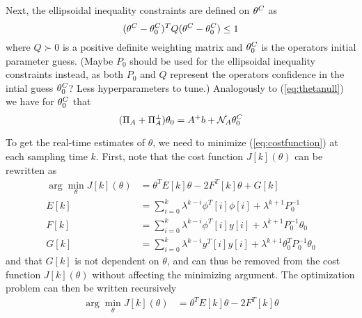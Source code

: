 Next, the ellipsoidal inequality constraints are defined on $\theta^C$ as
\begin{equation}
    (\theta^C - \theta^C_0)^TQ(\theta^C - \theta^C_0) \leq 1
\end{equation}
where $Q \succ 0$ is a positive definite weighting matrix and $\theta^C_0$ is
the operators initial parameter guess.
{\color{red}(Maybe $P_0$ should be used for the ellipsoidal inequality constraints
instead, as both $P_0$ and $Q$ represent the operators confidence in the intial guess
$\theta^C_0$? Less hyperparameters to tune.)}
Analogously to (\ref{eq:thetanull})
we have for $\theta^C_0$ that
\begin{equation}
    (\Pi_A + \Pi_A^\perp)\theta_0 = A^+b + \mathcal{N}_A\theta^C_0
\end{equation}



To get the real-time estimates of $\theta$, we need to minimize
(\ref{eq:costfunction}) at each sampling time $k$. First, note that the
cost function $J[k](\theta)$ can be rewritten as
\begin{equation}
    \begin{split}
        \arg\min\limits_{\theta} J[k](\theta) &= \theta^TE[k]\theta - 2F^T[k]\theta + G[k] \\
        E[k] &= \sum\limits_{i=0}^{k} \lambda^{k-i}\phi^T[i]\phi[i] + \lambda^{k+1}P_0^{-1} \\
        F[k] &= \sum\limits_{i=0}^{k} \lambda^{k-i}\phi^T[i]y[i] + \lambda^{k+1}P_0^{-1}\theta_0 \\
        G[k] &= \sum\limits_{i=0}^{k} \lambda^{k-i}y^T[i]y[i] + \lambda^{k+1}\theta_0^TP_0^{-1}\theta_0
    \end{split}
\end{equation}
and that $G[k]$ is not dependent on $\theta$, and can thus be removed from the
cost function $J[k](\theta)$ without affecting the minimizing argument. The
optimization problem can then be written recursively
\begin{equation}
    \begin{split}
        \arg\min\limits_{\theta} J[k](\theta) &= \theta^TE[k]\theta - 2F^T[k]\theta
    \end{split}
\end{equation}